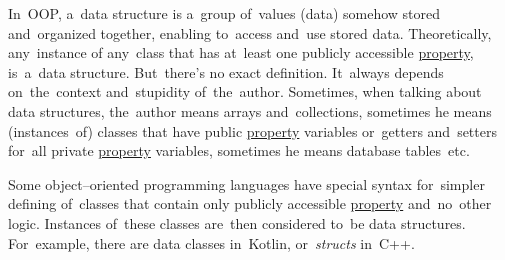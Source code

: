 \label{datastructure}
In~OOP, a~data structure is a~group of~values (data) somehow stored and~organized together, enabling to~access and~use stored data.
Theoretically, any~instance of any~class that has at~least one publicly accessible \hyperref[variablefieldproperty]{property}, is~a~data structure.
But~there's no exact definition.
It~always depends on~the~context and~stupidity of~the~author.
Sometimes, when talking about data structures, the~author means arrays and~collections, sometimes he means (instances~of) classes that have public \hyperref[variablefieldproperty]{property} variables or~getters and~setters for~all private \hyperref[variablefieldproperty]{property} variables, sometimes he means database tables~etc.

Some object--oriented programming languages have special syntax for~simpler defining of~classes that contain only publicly accessible \hyperref[variablefieldproperty]{property} and~no~other logic.
Instances of~these classes are~then considered to~be data structures.
For~example, there are data classes in~Kotlin, \mbox{or \textit{structs}} in~C++.
